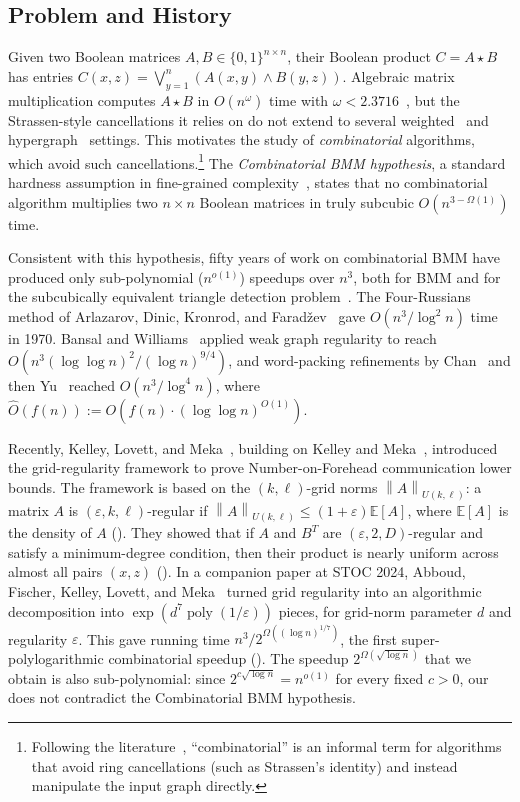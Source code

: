 \documentclass[11pt]{article}
\theoremstyle{definition}
\renewcommand{\label}[1]{}%
\newcommand{\E}{\mathbb{E}}
\newcommand{\poly}{\operatorname{poly}}
\newcommand{\norm}[1]{\left\lVert #1 \right\rVert}
\newcommand{\dens}[1]{\E[#1]}
\begin{document}
\subsection{Problem and History}
\label{sec:history}

Given two Boolean matrices $A, B \in \{0, 1\}^{n \times n}$, their Boolean product $C = A \star B$ has entries $C(x, z) = \bigvee_{y=1}^n (A(x, y) \wedge B(y, z))$. Algebraic matrix multiplication computes $A \star B$ in $O(n^\omega)$ time with $\omega < 2.3716$~\cite{Strassen69,DWZ23,VXXZ24}, but the Strassen-style cancellations it relies on do not extend to several weighted~\cite{VassilevskaWY07,WilliamsW18} and hypergraph~\cite{AbboudFS24} settings. This motivates the study of \emph{combinatorial} algorithms, which avoid such cancellations.\footnote{Following the literature~\cite{BansalW12,WilliamsW18,AFKLM24}, ``combinatorial'' is an informal term for algorithms that avoid ring cancellations (such as Strassen's identity) and instead manipulate the input graph directly.} The \emph{Combinatorial BMM hypothesis}, a standard hardness assumption in fine-grained complexity~\cite{WilliamsW18,AbboudVW14,AFKLM24}, states that no combinatorial algorithm multiplies two $n \times n$ Boolean matrices in truly subcubic $O(n^{3 - \Omega(1)})$ time.

Consistent with this hypothesis, fifty years of work on combinatorial BMM have produced only sub-polynomial ($n^{o(1)}$) speedups over $n^3$, both for BMM and for the subcubically equivalent triangle detection problem~\cite{Williams07,WilliamsW18}. The Four-Russians method of Arlazarov, Dinic, Kronrod, and Farad\v{z}ev~\cite{ADKF70} gave $O(n^3 / \log^2 n)$ time in 1970. Bansal and Williams~\cite{BansalW12} applied weak graph regularity to reach $O(n^3 (\log\log n)^2 / (\log n)^{9/4})$, and word-packing refinements by Chan~\cite{Chan15} and then Yu~\cite{Yu18} reached $\hat{O}(n^3 / \log^4 n)$, where $\hat{O}(f(n)) := O(f(n) \cdot (\log\log n)^{O(1)})$.

Recently, Kelley, Lovett, and Meka~\cite{KelleyLM23}, building on Kelley and Meka~\cite{KelleyM23}, introduced the grid-regularity framework to prove Number-on-Forehead communication lower bounds. The framework is based on the $(k, \ell)$-grid norms $\norm{A}_{U(k, \ell)}$: a matrix $A$ is $(\varepsilon, k, \ell)$-regular if $\norm{A}_{U(k, \ell)} \le (1 + \varepsilon)\dens{A}$, where $\dens{A}$ is the density of $A$ (). They showed that if $A$ and $B^T$ are $(\varepsilon, 2, D)$-regular and satisfy a minimum-degree condition, then their product is nearly uniform across almost all pairs $(x, z)$ (). In a companion paper at STOC 2024, Abboud, Fischer, Kelley, Lovett, and Meka~\cite{AFKLM24} turned grid regularity into an algorithmic decomposition into $\exp(d^7 \poly(1/\varepsilon))$ pieces, for grid-norm parameter $d$ and regularity $\varepsilon$. This gave running time $n^3 / 2^{\Omega((\log n)^{1/7})}$, the first super-polylogarithmic combinatorial speedup (). The speedup $2^{\Omega(\sqrt{\log n})}$ that we obtain is also sub-polynomial: since $2^{c\sqrt{\log n}} = n^{o(1)}$ for every fixed $c > 0$, our  does not contradict the Combinatorial BMM hypothesis.
\end{document}
